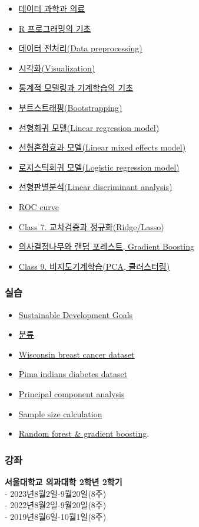 \documentclass[
]{article}
\providecommand{\tightlist}{%
  \setlength{\itemsep}{0pt}\setlength{\parskip}{0pt}}
\begin{document}
\begin{itemize}
\tightlist
\item
  \href{Intro.html}{데이터 과학과 의료}~
\item
  \href{R_basics.html}{R 프로그래밍의 기초}~
\item
  \href{Preprocessing.html}{데이터 전처리(Data preprocessing)}~
\item
  \href{Visualization.html}{시각화(Visualization)}~
\item
  \href{ML_basics.html}{통계적 모델링과 기계학습의 기초}~
\item
  \href{Bootstrapping.html}{부트스트래핑(Bootstrapping)}~
\item
  \href{LinearRegression.html}{선형회귀 모델(Linear regression model)}~
\item
  \href{LME.html}{선형혼합효과 모델(Linear mixed effects model)}~
\item
  \href{LogisticRegression.html}{로지스틱회귀 모델(Logistic regression
  model)}~
\item
  \href{LDA.html}{선형판별분석(Linear discriminant analysis)}~
\item
  \href{ROC.html}{ROC curve}~
\item
  \href{D7_CV_regularization.html}{Class 7. 교차검증과
  정규화(Ridge/Lasso)}~
\item
  \href{RandomForest_GradientBoosting.html}{의사결정나무와 랜덤
  포레스트, Gradient Boosting}~
\item
  \href{D9_Unsupervised.html}{Class 9. 비지도기계학습(PCA, 클러스터링)}~
\end{itemize}

\hypertarget{uxc2e4uxc2b5}{%
\subsubsection{실습}\label{uxc2e4uxc2b5}}

\begin{itemize}
\tightlist
\item
  \href{SDG.html}{Sustainable Development Goals}~
\item
  \href{Classification_problem.html}{분류}~
\item
  \href{breast_cancer.html}{Wisconsin breast cancer dataset}~
\item
  \href{diabetes.html}{Pima indians diabetes dataset}
\item
  \href{PCA.html}{Principal component analysis}~
\item
  \href{sampleSize.html}{Sample size calculation}~
\item
  \href{RandomForest.html}{Random forest \& gradient boosting}.
\end{itemize}

\hypertarget{uxac15uxc88c}{%
\subsubsection{강좌}\label{uxac15uxc88c}}

\textbf{서울대학교 의과대학 2학년 2학기}\\
- 2023년8월2일-9월20일(8주)\\
- 2022년8월2일-9월20일(8주)\\
- 2019년8월6일-10월1일(8주)
\end{document}
